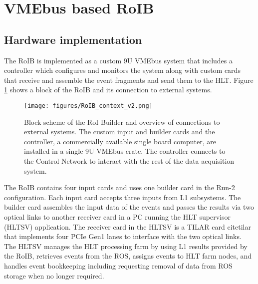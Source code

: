



\section{VMEbus based RoIB}\label{sec:roib}

\subsection{Hardware implementation}\label{sec:roib_current}

The RoIB is implemented as a custom 9U VMEbus system that includes a controller which configures and monitors the system along with custom cards 
that receive and assemble the event fragments and send them to the HLT. Figure \ref{roib_run1} shows a block of the RoIB and 
its connection to external systems.

\begin{figure}[tbp] %
\centering
\texttt{[image: figures/RoIB\_context\_v2.png]}
\caption{Block scheme of the RoI Builder and overview of connections to external systems.  The
custom input and builder cards and the controller, a commercially available single board computer,
are installed in a single 9U VMEbus crate. The controller connects to the Control Network to interact with the rest of the 
data acquisition system.}
\label{roib_run1}
\end{figure}

The RoIB contains four input cards and uses one builder card in the Run-2 configuration. Each input card accepts three inputs from 
L1 subsystems. 
The builder card assembles the input data of the events and passes the results via two optical links 
to another receiver card in a PC running the HLT supervisor (HLTSV) application. The receiver card in the HLTSV is a TILAR card cite{tilar}
 that implements four PCIe Gen1 lanes to interface with the two optical links. The HLTSV manages the HLT processing farm by using L1 results provided by the RoIB, retrieves events from the ROS, assigns events to HLT farm nodes, and handles event bookkeeping including requesting removal of data from ROS storage when no longer required. 

